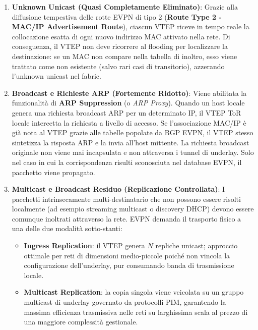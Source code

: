 \documentclass[11pt, a4paper]{article}
\begin{document}
\begin{enumerate}
    \item \textbf{Unknown Unicast (Quasi Completamente Eliminato)}:
    Grazie alla diffusione tempestiva delle rotte EVPN di tipo 2 (\textbf{Route Type 2 - MAC/IP Advertisement Route}), ciascun VTEP riceve in tempo reale la collocazione esatta di ogni nuovo indirizzo MAC attivato nella rete. Di conseguenza, il VTEP non deve ricorrere al flooding per localizzare la destinazione: se un MAC non compare nella tabella di inoltro, esso viene trattato come non esistente (salvo rari casi di transitorio), azzerando l'unknown unicast nel fabric.

    \item \textbf{Broadcast e Richieste ARP (Fortemente Ridotto)}:
    Viene abilitata la funzionalità di \textbf{ARP Suppression} (o \emph{ARP Proxy}). Quando un host locale genera una richiesta broadcast ARP per un determinato IP, il VTEP ToR locale intercetta la richiesta a livello di accesso. Se l'associazione MAC/IP è già nota al VTEP grazie alle tabelle popolate da BGP EVPN, il VTEP stesso sintetizza la risposta ARP e la invia all'host mittente. La richiesta broadcast originale non viene mai incapsulata e non attraversa i tunnel di underlay. Solo nel caso in cui la corrispondenza risulti sconosciuta nel database EVPN, il pacchetto viene propagato.

    \item \textbf{Multicast e Broadcast Residuo (Replicazione Controllata)}:
    I pacchetti intrinsecamente multi-destinatario che non possono essere risolti localmente (ad esempio streaming multicast o discovery DHCP) devono essere comunque inoltrati attraverso la rete. EVPN demanda il trasporto fisico a una delle due modalità sotto-stanti:
    \begin{itemize}[noitemsep]
        \item \textbf{Ingress Replication}: il VTEP genera $N$ repliche unicast; approccio ottimale per reti di dimensioni medio-piccole poiché non vincola la configurazione dell'underlay, pur consumando banda di trasmissione locale.
        \item \textbf{Multicast Replication}: la copia singola viene veicolata su un gruppo multicast di underlay governato da protocolli PIM, garantendo la massima efficienza trasmissiva nelle reti su larghissima scala al prezzo di una maggiore complessità gestionale.
    \end{itemize}
\end{enumerate}
\end{document}
